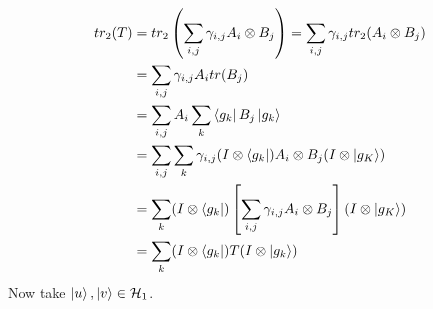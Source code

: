 \documentclass[a4paper, 11pt]{article}
\begin{document}
{\begin{itemize}
\begin{align*}
			tr_2(T) & = tr_2\left( \sum\limits_{i,j}\gamma_{i,j}A_i\otimes B_j \right)=\sum\limits_{i,j}\gamma_{i,j}tr_2(A_i\otimes B_j)\\
			& = \sum\limits_{i,j}\gamma_{i,j}A_i tr( B_j)\\
			& = \sum_{i,j}A_i\sum_k\bra{g_k}B_j\ket{g_k}\\
			& = \sum_{i,j}\sum_k\gamma_{i,j}(I\otimes \bra{g_k})A_i\otimes B_j(I\otimes \ket{g_K})\\
			& = \sum_k(I\otimes \bra{g_k})\left[ \sum_{i,j}\gamma_{i,j}A_i\otimes B_j\right](I\otimes \ket{g_K})\\
			& = \sum_k(I\otimes \bra{g_k})T(I\otimes \ket{g_k})
		\end{align*}Now take $\ket{u},\ket{v}\in \mathcal{H}_1$. 
	\end{itemize}
}

\end{document}
